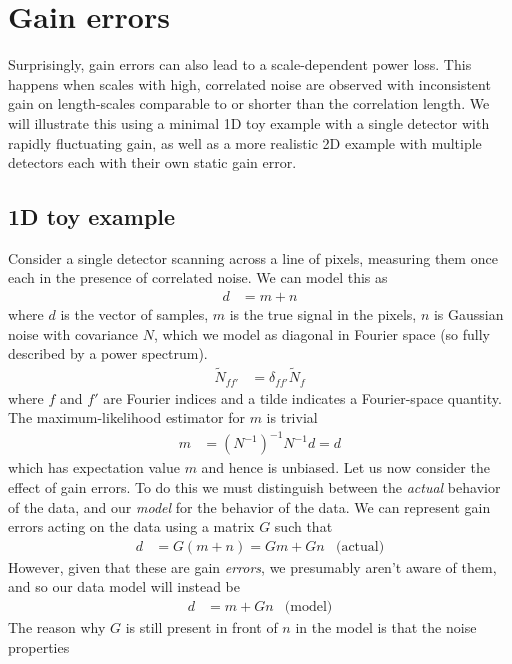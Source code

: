 \documentclass{aa}
\begin{document}
\section{Gain errors}
Surprisingly, gain errors can also lead to a scale-dependent power loss.
This happens when scales with high, correlated noise are observed with
inconsistent gain on length-scales comparable to or shorter than the
correlation length. We will illustrate this using a minimal 1D toy example
with a single detector with rapidly fluctuating gain, as well as a more
realistic 2D example with multiple detectors each with their own static
gain error.

\subsection{1D toy example}
Consider a single detector scanning across a line of pixels, measuring them
once each in the presence of correlated noise. We can model this as
\begin{align}
	d &= m + n
\end{align}
where $d$ is the vector of samples, $m$ is the true signal in the pixels,
$n$ is Gaussian noise with covariance $N$, which we model as diagonal in Fourier
space (so fully described by a power spectrum).
\begin{align}
	\widetilde{N}_{ff'} &= \delta_{ff'} \widetilde{N}_f
\end{align}
where $f$ and $f'$ are Fourier indices and a tilde indicates a Fourier-space quantity.
The maximum-likelihood estimator for $m$ is trivial
\begin{align}
	\hat m &= (N^{-1})^{-1} N^{-1} d = d
\end{align}
which has expectation value $m$ and hence is unbiased.
Let us now consider the effect of gain errors. To do this we must distinguish between
the \emph{actual} behavior of the data, and our \emph{model} for the behavior of the data.
We can represent gain errors acting on the data using a matrix $G$ such that
\begin{align}
	d &= G(m+n) = Gm + Gn & \text{(actual)} \label{eq:gain-true}
\end{align}
However, given that these are gain \emph{errors}, we presumably aren't aware of them,
and so our data model will instead be
\begin{align}
	d &= m + G n & \text{(model)} \label{eq:gain-model}
\end{align}
The reason why $G$ is still present in front of $n$ in the model is that the noise properties
\end{document}
